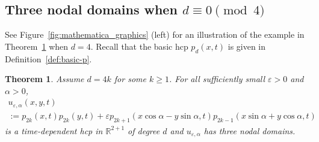 \documentclass[10pt]{amsart}
\newtheorem{theo}{Theorem}[section]
\theoremstyle{definition}\newtheorem{defi}[theo]{Definition}\newtheorem{rema}[theo]{Remark}\newtheorem{exam}[theo]{Example}\newtheorem{exem}[theo]{Example}\newtheorem{nota}[theo]{Notation}
\newcommand{\R}{\mathbb{R}}
\renewcommand{\epsilon}{\varepsilon}
\begin{document}
\subsection{Three nodal domains when \texorpdfstring{$d \equiv 0 \pmod 4$}{d is not congruent to 0 mod~4}}\label{subsec:0mod4}

See Figure~\ref{fig:mathematica_graphics} (left) for an illustration of the example in Theorem~\ref{thm:0mod4} when $d=4$. {Recall that the basic hcp $p_d(x,t)$ is given in Definition~\ref{def:basic-p}.}


\begin{theo}\label{thm:0mod4}
Assume $d=4k$ for some $k\geq 1$. For all sufficiently small $\epsilon > 0$ and $\alpha >0$,
\begin{multline}\label{eqn:u_0_mod_4}
u_{\epsilon,\alpha}(x,y,t)\\
:= p_{2k}(x,t)p_{2k}(y,t) + \epsilon p_{2k+1}(x\cos\alpha-y\sin\alpha,t)p_{2k-1}(x\sin\alpha+y\cos\alpha,t)
\end{multline}
is a time-dependent hcp in $\R^{2+1}$ of degree $d$ and $u_{\epsilon,\alpha}$ has three nodal domains.
\end{theo}
\end{document}
